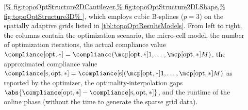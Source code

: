 \begin{table}
{    \cref{%
      fig:topoOptStructure2DCantilever,%
      fig:topoOptStructure2DLShape,%
      fig:topoOptStructure3D%
    }, which employs cubic B-splines ($p = 3$) on the spatially
    adaptive grids listed in \cref{tbl:topoOptResultsModels}.
    From left to right, the columns contain
    the optimization scenario,
    the micro-cell model,
    the number of optimization iterations,
    the actual compliance value
    $\trcmp = \compliance(\mcpoptappr{1}, \dotsc, \mcpoptappr{M})$,
    the approximated compliance value
    $\apcmp = \complianceintp(\mcpoptappr{1}, \dotsc, \mcpoptappr{M})$
    as reported by the optimizer,
    the optimality-interpolation gaps $\abs{\trcmp - \apcmp}$, and
    the runtime of the online phase
    (without the time to generate the sparse grid data).%
  }%
  \label{tbl:topoOptResultsDetailed}%
\end{table}

